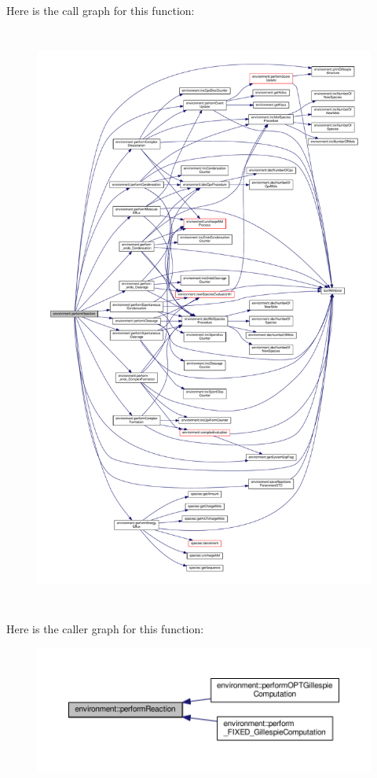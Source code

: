 Here is the call graph for this function\-:\nopagebreak
\begin{figure}[H]
\begin{center}
\leavevmode
\includegraphics[height=550pt]{a00003_a1db4e67ba458a54f4fab3e10a203765c_cgraph}
\end{center}
\end{figure}




Here is the caller graph for this function\-:\nopagebreak
\begin{figure}[H]
\begin{center}
\leavevmode
\includegraphics[width=350pt]{a00003_a1db4e67ba458a54f4fab3e10a203765c_icgraph}
\end{center}
\end{figure}


